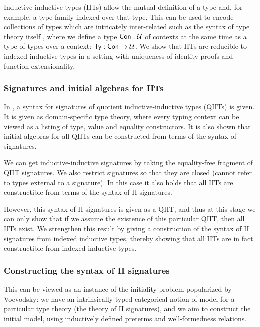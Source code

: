 

Inductive-inductive types \cite{nordvallinductive, gabephd} (IITs) allow the
mutual definition of a type and, for example, a type family indexed over that
type.  This can be used to encode collections of types which are intricately
inter-related such as the syntax of type theory itself \cite{ttintt}, where we
define a type $\mathsf{Con} : \mathcal{U}$ of contexts at the same time as a type of types over
a context: $\mathsf{Ty} : \mathsf{Con} \to \mathcal{U}$. We show that IITs are reducible to indexed
inductive types in a setting with uniqueness of identity proofs and function
extensionality.

\subsubsection*{Signatures and initial algebras for IITs}

In \cite{qiit}, a syntax for signatures of quotient inductive-inductive types
(QIITs) is given. It is given as domain-specific type theory, where every typing
context can be viewed as a listing of type, value and equality constructors. It
is also shown that initial algebras for all QIITs can be constructed from terms
of the syntax of signatures.

We can get inductive-inductive signatures by taking the equality-free fragment
of QIIT signatures. We also restrict signatures so that they are closed (cannot
refer to types external to a signature). In this case it also holds that all
IITs are constructible from terms of the syntax of II signatures.

However, this syntax of II signatures is given as a QIIT, and thus at this stage
we can only show that if we assume the existence of this particular QIIT, then
all IITs exist. We strengthen this result by giving a construction of the syntax
of II signatures from indexed inductive types, thereby showing that all IITs are
in fact constructible from indexed inductive types.

\subsubsection*{Constructing the syntax of II signatures}

This can be viewed as an instance of the initiality problem popularized by
Voevodsky: we have an intrinsically typed categorical notion of model for a
particular type theory (the theory of II signatures), and we aim to construct
the initial model, using inductively defined preterms and well-formedness
relations.

